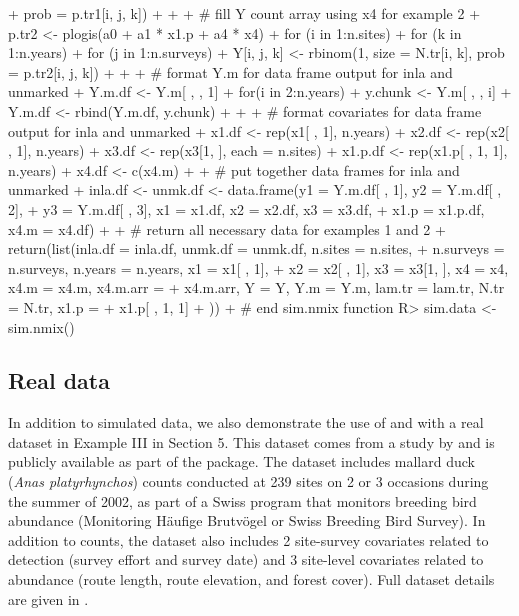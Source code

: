 \documentclass[codesnippet]{jss}
\begin{document}
\begin{CodeInput}
{{{{+            prob = p.tr1[i, j, k])
+    }}}
+
+    # fill Y count array using x4 for example 2
+    p.tr2 <- plogis(a0 + a1 * x1.p + a4 * x4)
+    for (i in 1:n.sites){
+      for (k in 1:n.years){
+        for (j in 1:n.surveys){
+          Y[i, j, k] <- rbinom(1, size = N.tr[i, k], prob = p.tr2[i, j, k])
+    }}}
+
+    # format Y.m for data frame output for inla and unmarked
+    Y.m.df <- Y.m[ , , 1]
+    for(i in 2:n.years){
+      y.chunk <- Y.m[ , , i]
+      Y.m.df <- rbind(Y.m.df, y.chunk)
+    }
+
+    # format covariates for data frame output for inla and unmarked
+    x1.df <- rep(x1[ , 1], n.years)
+    x2.df <- rep(x2[ , 1], n.years)
+    x3.df <- rep(x3[1, ], each = n.sites)
+    x1.p.df <- rep(x1.p[ , 1, 1], n.years)
+    x4.df <- c(x4.m)
+
+    # put together data frames for inla and unmarked
+    inla.df <- unmk.df <- data.frame(y1 = Y.m.df[ , 1], y2 = Y.m.df[ , 2],
+      y3 = Y.m.df[ , 3], x1 = x1.df, x2 = x2.df, x3 = x3.df,
+      x1.p = x1.p.df, x4.m = x4.df)
+
+    # return all necessary data for examples 1 and 2
+    return(list(inla.df = inla.df, unmk.df = unmk.df, n.sites = n.sites,
+      n.surveys = n.surveys, n.years = n.years, x1 = x1[ , 1],
+      x2 = x2[ , 1], x3 = x3[1, ], x4 = x4, x4.m = x4.m, x4.m.arr = 
+      x4.m.arr, Y = Y, Y.m = Y.m, lam.tr = lam.tr, N.tr = N.tr, x1.p = 
+        x1.p[ , 1, 1]
+    ))
+  } # end sim.nmix function
R> sim.data <- sim.nmix()
\end{CodeInput}

\subsection[Real data]{Real data}
In addition to simulated data, we also demonstrate the use of  
and  with a real dataset in Example III in Section 5. This 
dataset comes from a study by \cite{Kery_Royle_Schmid_2005} and is publicly 
available as part of the  package. The dataset includes 
mallard duck (\emph{Anas platyrhynchos}) counts conducted at 239 sites on 2 
or 3 occasions during the summer of 2002, as part of a Swiss program that 
monitors breeding bird abundance (Monitoring H\"{a}ufige Brutv\"{o}gel or 
Swiss Breeding Bird Survey). In addition to counts, the dataset also 
includes 2 site-survey covariates related to detection (survey effort and 
survey date) and 3 site-level covariates related to abundance (route 
length, route elevation, and forest cover). Full dataset details are given 
in \cite{Kery_Royle_Schmid_2005}.
\end{document}
